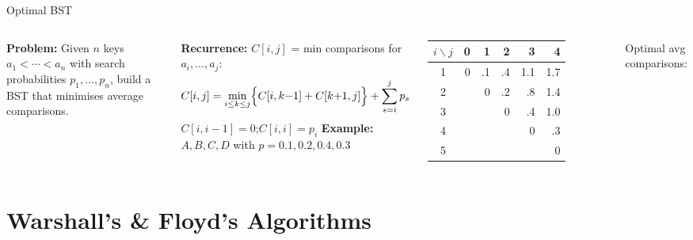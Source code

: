 \documentclass[aspectratio=169]{beamer}
\begin{document}
\begin{frame}[shrink=12]{Optimal BST}
  \begin{columns}[T]
      \textbf{Problem:} Given $n$ keys $a_1 < \cdots < a_n$ with
      search probabilities $p_1,\ldots,p_n$, build a BST that
      minimises average comparisons.

      \vspace{0.3em}
      \textbf{Recurrence:} $C[i,j]$ = min comparisons for $a_i,\ldots,a_j$:
      \[
        C[i,j] = \min_{i\leq k\leq j}
          \Bigl\{C[i,k{-}1] + C[k{+}1,j]\Bigr\} + \sum_{s=i}^{j}p_s
      \]
      $C[i,i{-}1] = 0$;\quad $C[i,i] = p_i$
      \textbf{Example:} $A,B,C,D$ with $p = 0.1,0.2,0.4,0.3$

      \vspace{0.2em}
      \begin{tabular}{c*{5}{r}}
        \toprule
        $i\backslash j$ & 0 & 1 & 2 & 3 & 4 \\
        \midrule
        1 & 0 & .1 & .4 & 1.1 & 1.7 \\
        2 & & 0 & .2 & .8 & 1.4 \\
        3 & & & 0 & .4 & 1.0 \\
        4 & & & & 0 & .3 \\
        5 & & & & & 0 \\
        \bottomrule
      \end{tabular}
      \vspace{0.2em}
      Optimal avg comparisons: 
  \end{columns}
\end{frame}

\section{Warshall's \& Floyd's Algorithms}
\end{document}
